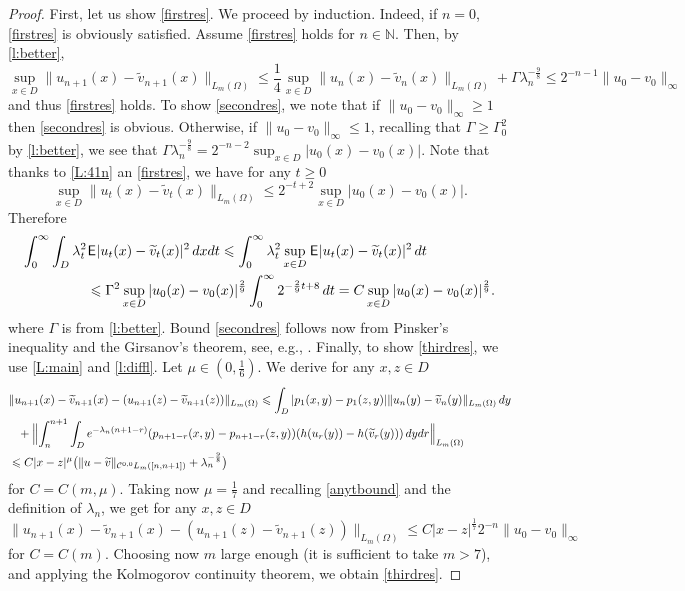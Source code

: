 \documentclass[12pt]{article}
\theoremstyle{definition}
\DeclareMathOperator{\1}{\mathbbm{1}}%
\def\E{\hskip.15ex\mathsf{E}\hskip.10ex}
\renewcommand{\ge}{\geqslant}
\renewcommand{\le}{\leqslant}
\newcommand{\dis}{\infty}
\newcommand{\wt}{\widetilde}
\newcommand{\C}{\mathcal{C}}
\newcommand{\N}{\mathbb{N}}
\begin{document}
\begin{proof}
  First, let us show \eqref{firstres}. We proceed by induction. Indeed, if $n=0$, \eqref{firstres} is obviously satisfied. Assume \eqref{firstres} holds for $n\in\N$. Then, by \cref{l:better},
$$\sup_{x\in D}\|u_{n+1}(x)-\wt v_{n+1}(x)\|_{L_m(\Omega)}\le \frac1{4}\sup_{x\in D}\|u_{n}(x)-\wt v_{n}(x)\|_{L_m(\Omega)}+\Gamma \lambda_n^{-\frac98}
\le 2^{-n-1}\|u_0-v_0\|_{\dis}
$$
and thus \eqref{firstres} holds.
To show \eqref{secondres}, we note that if $\|u_0-v_0\|_\infty\ge1$ then \eqref{secondres} is obvious. Otherwise, if $\|u_0-v_0\|_\infty\le1$, recalling that $\Gamma\ge\Gamma_0^2$ by \cref{l:better}, we see that 
$
\Gamma \lambda_n^{-\frac98}= 2^{-n-2}\sup_{x\in D}|u_0(x)-v_0(x)|.
$
Note that thanks to \cref{L:41n} an \eqref{firstres}, we have for any $t\ge0$
\begin{equation}\label{anytbound}
\sup_{x\in D}\|u_t(x)-\wt v_t(x)\|_{L_m(\Omega)}\le  2^{-t+2}\sup_{x\in D}|u_0(x)-v_0(x)|.
\end{equation}
Therefore
\begin{align*}
\int_0^\infty\int_D \lambda_t^2 & \E|u_t(x)-\wt v_t(x)|^2\,dxdt\le \int_0^\infty \lambda_t^2 \sup_{x\in D}   \E|u_t(x)-\wt v_t(x)|^2\,dt\\
&\le   \Gamma^{2} \sup_{x\in D}|u_0(x)-v_0(x)|^{\frac29}\int_0^\infty 2^{-\frac29t+8}\, dt =C\sup_{x\in D}|u_0(x)-v_0(x)|^{\frac29}.
\end{align*}
where $\Gamma$ is from \cref{l:better}. Bound \eqref{secondres} follows now from Pinsker's inequality and the Girsanov's theorem, see, e.g., \cite[Lemma A.1, Theorem A.2]{BKS18}.
Finally, to show \eqref{thirdres}, we use \cref{L:main} and \cref{l:diffl}. Let $\mu\in(0,\frac16)$. We derive for any $x,z\in D$
\begin{align*}
&\|u_{n+1}(x)-\wt v_{n+1}(x)-(u_{n+1}(z)-\wt v_{n+1}(z))\|_{L_m(\Omega)}\le \int_D |p_1(x,y)-p_1(z,y)| \|u_{n}(y)-\wt v_{n}(y)\|_{L_m(\Omega)}\,dy\\
	&\phantom{\le}+\Bigl\|\int_{n}^{n+1} \int_{D}e^{-\lambda_n(n+1-r)} (p_{n+1-r}(x,y)-p_{n+1-r}(z,y))(h(u_r(y))-h(\wt v_r(y)))\,dydr\Bigr\|_{L_m(\Omega)}\\
	&\le C|x-z|^{\mu}\bigl(\|u-\wt v\|_{\C^{0,0} L_m([n,n+1])}+\lambda_{n}^{-\frac98}\bigr)
\end{align*}
for $C=C(m,\mu)$. Taking now $\mu=\frac17$ and recalling  \eqref{anytbound} and the definition of $\lambda_n$, we get for any $x,z\in D$
\begin{equation*}
\|u_{n+1}(x)-\wt v_{n+1}(x)-(u_{n+1}(z)-\wt v_{n+1}(z))\|_{L_m(\Omega)}\le C|x-z|^{\frac17} 2^{-n}\|u_0-v_0\|_{\dis}
\end{equation*}
for $C=C(m)$. Choosing now $m$ large enough (it is sufficient to take $m>7$), and applying the Kolmogorov continuity theorem, we obtain \eqref{thirdres}.	
\end{proof}
\end{document}
